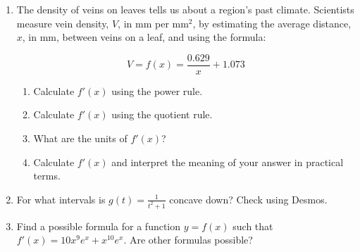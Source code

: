 \documentclass[12pt]{article}
\begin{document}
\begin{enumerate}
\begin{minipage}{0.6\textwidth}
	\vspace{10mm}
	 (b) $\displaystyle h'\left(0\right)$\\
	 
	\vspace{10mm}
	(c) $\displaystyle h'\left(2\right)$\\
\end{minipage}
\newpage
~
\item The density of veins on leaves tells us about a region's past climate. Scientists measure vein density, $V$, in mm per mm$^2$, by estimating the average distance, $x$, in mm, between veins on a leaf, and using the formula:

$$V=f(x)=\frac{0.629}{x}+1.073$$
	\begin{enumerate}
	\item Calculate $f'(x)$ using the power rule.
	\vfill
	\item Calculate $f'(x)$ using the quotient rule.
	\vfill
	\item What are the units of $f'(x)$?
	\vfill
	\item Calculate $f'(x)$ and interpret the meaning of your answer in practical terms.
	\end{enumerate}
\vfill
\item For what intervals is $\displaystyle g\left(t\right)=\frac{1}{t^{2}+1}$ concave down? Check using Desmos.
\vfill
\item Find a possible formula for a function $y=f(x)$ such that $f'(x)=10x^{9}e^{x}+x^{10}e^{x}$. Are other formulas possible?
\vfill

\end{enumerate}
\end{document}
